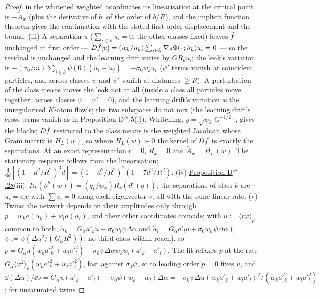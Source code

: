 \begin{proof}
in the whitened weighted coordinates its linearisation at the critical point is $-\tilde A_w$ (plus the derivative of
$b$, of the order of $b/R$), and the implicit function theorem gives the continuation with the stated first-order
displacement and the bound. (iii) A separation $u$ ($\sum_{i\in k}u_i = 0$, the other classes fixed) leaves $\hat f$
unchanged at first order --- $D\hat f[u] = (w_k/n_k)\sum_{i\in k}\nabla_\vartheta\tilde\Phi(\cdot\,;\vartheta_k)u_i = 0$
--- so the residual is unchanged and the learning drift varies by $GR_ku_i$; the leak's variation is
$-(\sigma_0/m)\sum_{j\in k}\psi(0)(u_i - u_j) = -\sigma_0w_ku_i$ ($\psi'$ terms vanish at coincident particles, and
across classes $\psi$ and $\psi'$ vanish at distances $\ge R$). A perturbation of the class means moves the leak not
at all (inside a class all particles move together; across classes $\psi = \psi' = 0$), and the learning drift's
variation is the unregularised $K$-atom flow's; the two subspaces do not mix (the learning drift's cross terms vanish
as in Proposition D$'''$.5(i)). Whitening, $y = \sqrt{w_k}G^{-1/2}\cdot$, gives the blocks; $D\hat f$ restricted to
the class means is the weighted Jacobian whose Gram matrix is $H_L(w)$, so where $H_L(w)\succ0$ the kernel of
$D\hat f$ is exactly the separations. At an exact representation $r = 0$, $R_k = 0$ and $\tilde A_w = H_L(w)$. The
stationary response follows from the linearisation;
$\frac{\mathrm{d}}{\mathrm{d}d}[(1 - d^2/R^2)^3d] = (1 - d^2/R^2)^2(1 - 7d^2/R^2)$. (iv)
\hyperref[res:thmDppp:28]{Proposition D$'''$.28}(iii): $R_k(\vartheta^b(w)) = (q_k/w_k)R_k(\vartheta^b(q))$; the
separations of class $k$ are $u_i = c_iv$ with $\sum c_i = 0$ along each eigenvector $v$, all with the same linear
rate. (v) Twins: the network depends on their amplitudes only through $p = w_ka(\alpha_k) + w_la(\alpha_l)$, and their
other coordinates coincide; with $u := \langle r\varphi\rangle_\rho$ common to both,
$\dot\alpha_k = G_\alpha a'_ku - \sigma_0w_l\psi\Delta\alpha$ and
$\dot\alpha_l = G_\alpha a'_lu + \sigma_0w_k\psi\Delta\alpha$ ($\psi := \psi(\Delta\alpha^2/(G_\alpha R^2))$; no
third class within reach), so
$\dot p = G_\alpha u(w_ka'^2_k + w_la'^2_l) - \sigma_0\psi\Delta\alpha w_kw_l(a'_k - a'_l)$. The fit relaxes $p$ at
the rate $G_\alpha\langle\varphi^2\rangle_\rho(w_ka'^2_k + w_la'^2_l)$, fast against $\sigma_0\psi$, so to leading
order $\dot p = 0$ fixes $u$, and
$\dd(\Delta\alpha)/\dd s = G_\alpha u(a'_k - a'_l) - \sigma_0\psi(w_k + w_l)\Delta\alpha
= -\sigma_0\psi\Delta\alpha(w_ka'_k + w_la'_l)^2/(w_ka'^2_k + w_la'^2_l)$; for unsaturated twins

\end{proof}
